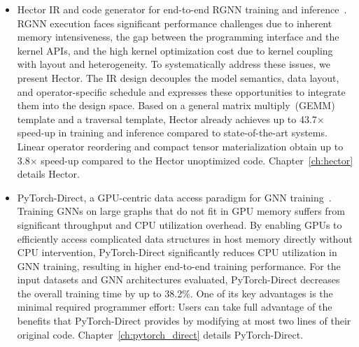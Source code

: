 \begin{itemize}
\item Hector IR and code generator for end-to-end RGNN training and inference~\cite{wuHectorEfficientProgramming2024}. RGNN execution faces significant performance challenges due to inherent memory intensiveness, the gap between the programming interface and the kernel APIs, and the high kernel optimization cost due to kernel coupling with layout and heterogeneity. To systematically address these issues, we present Hector.  The IR design decouples the model semantics, data layout, and operator-specific schedule and expresses these opportunities to integrate them into the design space. Based on a general matrix multiply~(GEMM) template and a traversal template, Hector already achieves up to 43.7$\times$ speed-up in training and inference compared to state-of-the-art systems. Linear operator reordering and compact tensor materialization obtain up to 3.8$\times$ speed-up compared to the Hector unoptimized code. Chapter~\ref{ch:hector} details Hector.
\item PyTorch-Direct, a GPU-centric data access paradigm for GNN training~\cite{min2021pytorchdirect,minLargeGraphConvolutional2021,minGraphNeuralNetwork2022}. Training GNNs on large graphs that do not fit in GPU memory suffers from significant throughput and CPU utilization overhead. By enabling GPUs to efficiently access complicated data structures in host memory directly without CPU intervention, PyTorch-Direct significantly reduces CPU utilization in GNN training, resulting in higher end-to-end training performance. For the input datasets and GNN architectures evaluated, PyTorch-Direct decreases the overall training time by up to 38.2\%. One of its key advantages is the minimal required programmer effort: Users can take full advantage of the benefits that PyTorch-Direct provides by modifying at most two lines of their original code. Chapter~\ref{ch:pytorch_direct} details PyTorch-Direct.

\end{itemize}
